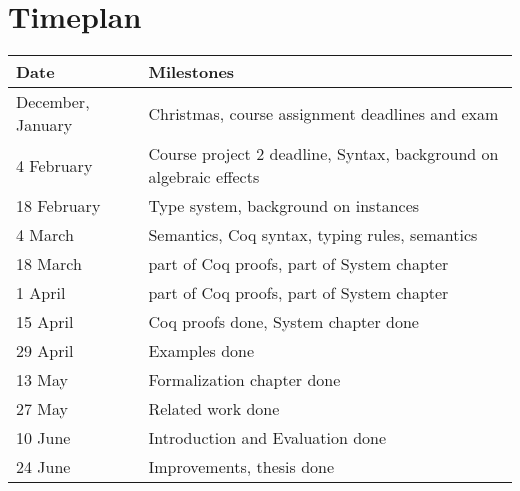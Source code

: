 \documentclass[12pt]{article}
\begin{document}
\section{Timeplan}
\begin{tabular}{ l | l }
\textbf{Date}             & \textbf{Milestones}                      \\ \hline
December, January & Christmas, course assignment deadlines and exam \\ \hline
4 February & Course project 2 deadline, Syntax, background on algebraic effects      \\ \hline
18 February & Type system, background on instances \\ \hline
4 March & Semantics, Coq syntax, typing rules, semantics      \\ \hline
18 March & part of Coq proofs, part of System chapter  \\ \hline
1 April & part of Coq proofs, part of System chapter  \\ \hline
15 April & Coq proofs done, System chapter done      \\ \hline
29 April & Examples done      \\ \hline
13 May & Formalization chapter done      \\ \hline
27 May & Related work done     \\ \hline
10 June & Introduction and Evaluation done      \\ \hline
24 June & Improvements, thesis done      \\ \hline
\end{tabular}
\end{document}

